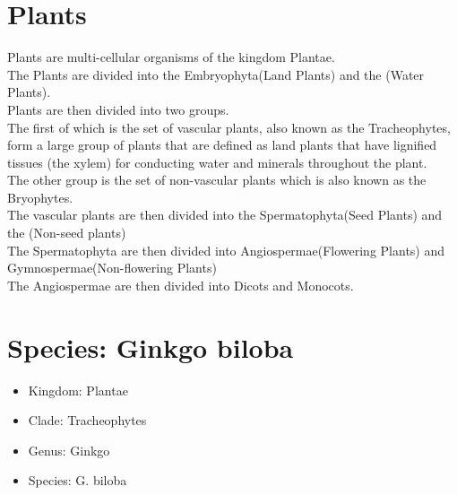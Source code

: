 \documentclass[10pt]{extarticle}
\begin{document}
\section{Plants}
Plants are multi-cellular organisms of the kingdom Plantae. \\ 
The Plants are divided into the Embryophyta(Land Plants) and the (Water Plants).  \\
Plants are then divided into two groups. \\
The first of which is the set of vascular plants, also known as the Tracheophytes, form a large group of plants that are defined as land plants that have lignified tissues (the xylem) for conducting water and minerals throughout the plant. \\
The other group is the set of non-vascular plants which is also known as the Bryophytes. \\
The vascular plants are then divided into the Spermatophyta(Seed Plants) and the (Non-seed plants) \\ 
The Spermatophyta are then divided into Angiospermae(Flowering Plants) and Gymnospermae(Non-flowering Plants) \\ 
The Angiospermae are then divided into Dicots and Monocots. 
\section{Species: Ginkgo biloba}
\begin{itemize}
	\item Kingdom: 	Plantae
	\item Clade: 	Tracheophytes
	\item Genus: 	Ginkgo
	\item Species: 	G. biloba
\end{itemize}
\end{document}
